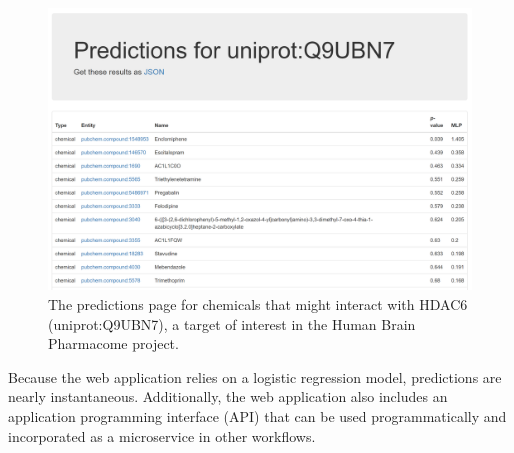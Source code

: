 \begin{figure}[h!]
    \centering
    \includegraphics[scale=0.5]
    {figures/protein_prediction.png}
    \caption[The predictions page for chemicals that might interact with HDAC6]{\label{fig:protein_prediction} The predictions page for chemicals that might interact with HDAC6 (uniprot:Q9UBN7), a target of interest in the Human Brain Pharmacome project\footnotemark .}
\end{figure}


Because the web application relies on a logistic regression model, predictions are nearly instantaneous. Additionally, the web application also includes an application programming interface (API) that can be used programmatically and incorporated as a microservice in other workflows.
